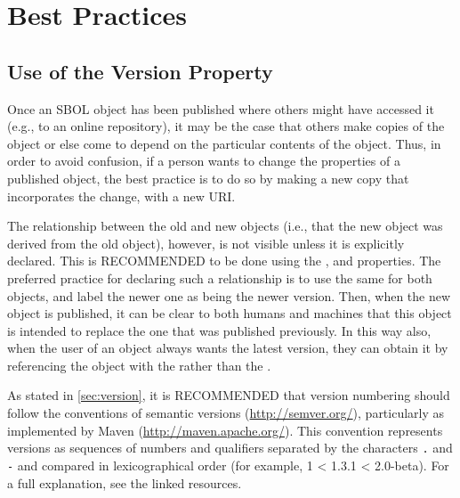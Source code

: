 \section{Best Practices}
\label{sec:bestpractices}
\subsection{Use of the Version Property}

Once an SBOL object has been published where others might have accessed it (e.g., to an online repository), it may be the case that others make copies of the object or else come to depend on the particular contents of the object.  Thus, in order to avoid confusion, if a person wants to change the properties of a published object, the best practice is to do so by making a new copy that incorporates the change, with a new URI.

The relationship between the old and new objects (i.e., that the new object was derived from the old object), however, is not visible unless it is explicitly declared.  This is RECOMMENDED to be done using the , and  properties. The preferred practice for declaring such a relationship is to use the same  for both objects, and label the newer one as being the newer version. Then, when the new object is published, it can be clear to both humans and machines that this object is intended to replace the one that was published previously.  In this way also, when the user of an object always wants the latest version, they can obtain it by referencing the object with the  rather than the .

As stated in \ref{sec:version},  it is RECOMMENDED that version numbering should follow the conventions of semantic versions (\url{http://semver.org/}), particularly as implemented by Maven (\url{http://maven.apache.org/}).  This convention represents versions as sequences of numbers and qualifiers separated by the characters {\tt .} and {\tt -} and compared in lexicographical order (for example, 1 < 1.3.1 < 2.0-beta).  For a full explanation, see the linked resources.


